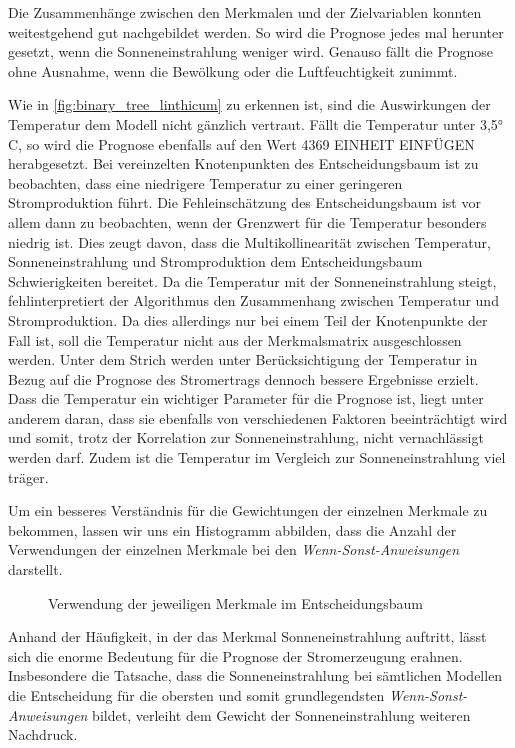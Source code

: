 \documentclass[12pt, a4paper]{article}
\begin{document}
Die Zusammenhänge zwischen den Merkmalen und der Zielvariablen konnten weitestgehend gut nachgebildet werden. So wird die Prognose jedes mal herunter gesetzt, wenn die Sonneneinstrahlung weniger wird. Genauso fällt die Prognose ohne Ausnahme, wenn die Bewölkung oder die Luftfeuchtigkeit zunimmt. 

Wie in \autoref{fig:binary_tree_linthicum} zu erkennen ist, sind die Auswirkungen der Temperatur dem Modell nicht gänzlich vertraut. Fällt die Temperatur unter 3,5° C, so wird die Prognose ebenfalls auf den Wert 4369 EINHEIT EINFÜGEN herabgesetzt. Bei vereinzelten Knotenpunkten des Entscheidungsbaum ist zu beobachten, dass eine niedrigere Temperatur zu einer geringeren Stromproduktion führt. Die Fehleinschätzung des Entscheidungsbaum ist vor allem dann zu beobachten, wenn der Grenzwert für die Temperatur besonders niedrig ist. Dies zeugt davon, dass die Multikollinearität zwischen Temperatur, Sonneneinstrahlung und Stromproduktion dem Entscheidungsbaum Schwierigkeiten bereitet. Da die Temperatur mit der Sonneneinstrahlung steigt, fehlinterpretiert der Algorithmus den Zusammenhang zwischen Temperatur und Stromproduktion. Da dies allerdings nur bei einem Teil der Knotenpunkte der Fall ist, soll die Temperatur nicht aus der Merkmalsmatrix ausgeschlossen werden. Unter dem Strich werden unter Berücksichtigung der Temperatur in Bezug auf die Prognose des Stromertrags dennoch bessere Ergebnisse erzielt. Dass die Temperatur ein wichtiger Parameter für die Prognose ist, liegt unter anderem daran, dass sie ebenfalls von verschiedenen Faktoren beeinträchtigt wird und somit, trotz der Korrelation zur Sonneneinstrahlung, nicht vernachlässigt werden darf. Zudem ist die Temperatur im Vergleich zur Sonneneinstrahlung viel träger.

Um ein besseres Verständnis für die Gewichtungen der einzelnen Merkmale zu bekommen, lassen wir uns ein Histogramm abbilden, dass die Anzahl der Verwendungen der einzelnen Merkmale bei den \textit{Wenn-Sonst-Anweisungen} darstellt.

\begin{figure}[H]
\centering
\fontsize{20}{20}\selectfont
\def\svgwidth{400pt}

\caption{Verwendung der jeweiligen Merkmale im Entscheidungsbaum}
\label{fig:histogram_feature_quantity}
\end{figure}

Anhand der Häufigkeit, in der das Merkmal Sonneneinstrahlung auftritt, lässt sich die enorme Bedeutung für die Prognose der Stromerzeugung erahnen. Insbesondere die Tatsache, dass die Sonneneinstrahlung bei sämtlichen Modellen die Entscheidung für die obersten und somit grundlegendsten \textit{Wenn-Sonst-Anweisungen} bildet, verleiht dem Gewicht der Sonneneinstrahlung weiteren Nachdruck.
\end{document}
